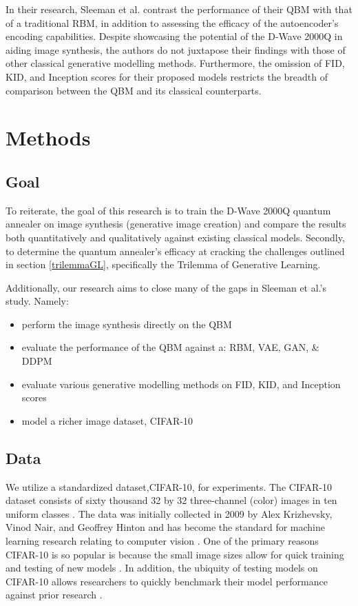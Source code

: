 \documentclass[%
 reprint,
 amsmath,amssymb,
 aps,
]{revtex4-2}
\begin{document}
In their research, Sleeman et al. contrast the performance of their QBM with that of a traditional RBM, in addition to assessing the efficacy of the autoencoder's encoding capabilities. Despite showcasing the potential of the D-Wave 2000Q in aiding image synthesis, the authors do not juxtapose their findings with those of other classical generative modelling methods. Furthermore, the omission of FID, KID, and Inception scores for their proposed models restricts the breadth of comparison between the QBM and its classical counterparts.

\section{Methods}
\subsection{Goal}
To reiterate, the goal of this research is to train the D-Wave 2000Q quantum annealer on image synthesis (generative image creation) and compare the results both quantitatively and qualitatively against existing classical models. Secondly, to determine the quantum annealer's efficacy at cracking the challenges outlined in section \ref{trilemmaGL}, specifically the Trilemma of Generative Learning. 



Additionally, our research aims to close many of the gaps in Sleeman et al.'s study. Namely:

\begin{itemize}
    \item perform the image synthesis directly on the QBM
    \item evaluate the performance of the QBM against a: RBM, VAE, GAN, \& DDPM
    \item evaluate various generative modelling methods on FID, KID, and Inception scores
    \item model a richer image dataset, CIFAR-10
\end{itemize}

\subsection{Data}
We utilize a standardized dataset,CIFAR-10, for experiments. The CIFAR-10 dataset consists of sixty thousand 32 by 32 three-channel (color) images in ten uniform classes \cite{CIFAR}. The data was initially collected in 2009 by Alex Krizhevsky, Vinod Nair, and Geoffrey Hinton and has become the standard for machine learning research relating to computer vision \cite{Krizhevsky09learningmultiple}. One of the primary reasons CIFAR-10 is so popular is because the small image sizes allow for quick training and testing of new models \cite{ai_progress_measurement}. In addition, the ubiquity of testing models on CIFAR-10 allows researchers to quickly benchmark their model performance against prior research \cite{ai_progress_measurement}.
\end{document}
